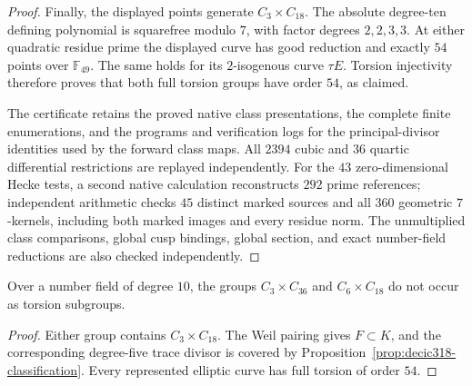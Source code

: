 \begin{proof}
Finally, the displayed points generate $C_3\times C_{18}$.
The absolute degree-ten defining polynomial is squarefree modulo
$7$, with factor degrees $2,2,3,3$.
At either quadratic residue prime the displayed curve has good
reduction and exactly $54$ points over $\mathbb F_{49}$.
The same holds for its $2$-isogenous curve $\tau E$.
Torsion injectivity therefore proves that both full torsion groups
have order $54$, as claimed.

The certificate retains the proved native class presentations,
the complete finite enumerations, and the programs and verification
logs for the principal-divisor identities used by the forward class maps.
All $2394$ cubic and $36$ quartic differential restrictions are
replayed independently. For the $43$ zero-dimensional Hecke tests,
a second native calculation reconstructs $292$ prime references;
independent arithmetic checks $45$ distinct marked sources and all
$360$ geometric $7$-kernels, including both marked images and every
residue norm. The unmultiplied class comparisons, global cusp
bindings, global section, and exact number-field reductions are
also checked independently.
\end{proof}

\begin{corollary}\label{cor:decic318-no-larger}
Over a number field of degree $10$, the groups $C_3\times C_{36}$
and $C_6\times C_{18}$ do not occur as torsion subgroups.
\end{corollary}
\begin{proof}
Either group contains $C_3\times C_{18}$.
The Weil pairing gives $F\subset K$, and the corresponding degree-five
trace divisor is covered by Proposition~\ref{prop:decic318-classification}.
Every represented elliptic curve has full torsion of order $54$.
\end{proof}
